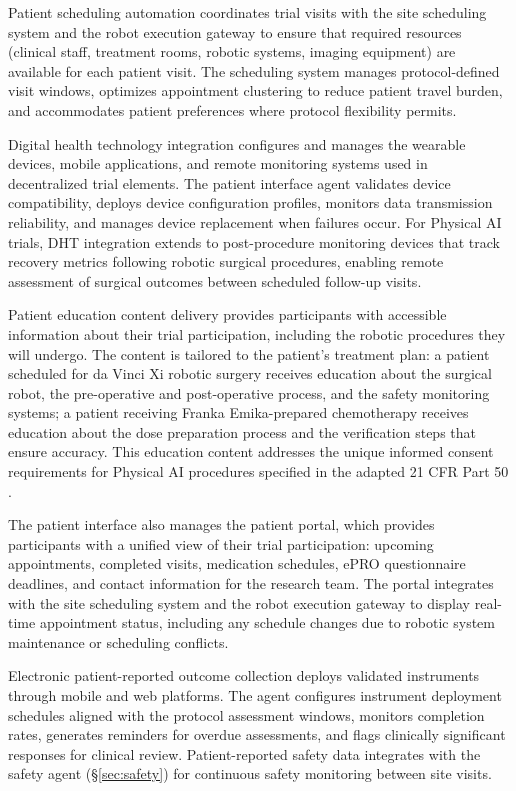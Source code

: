 Patient scheduling automation coordinates trial visits with the site scheduling system and
the robot execution gateway to ensure that required resources (clinical staff, treatment
rooms, robotic systems, imaging equipment) are available for each patient visit. The
scheduling system manages protocol-defined visit windows, optimizes appointment clustering
to reduce patient travel burden, and accommodates patient preferences where protocol
flexibility permits.

Digital health technology integration configures and manages the wearable devices, mobile
applications, and remote monitoring systems used in decentralized trial elements. The
patient interface agent validates device compatibility, deploys device configuration
profiles, monitors data transmission reliability, and manages device replacement when
failures occur. For Physical AI trials, DHT integration extends to post-procedure
monitoring devices that track recovery metrics following robotic surgical procedures,
enabling remote assessment of surgical outcomes between scheduled follow-up visits.

Patient education content delivery provides participants with accessible information
about their trial participation, including the robotic procedures they will undergo. The
content is tailored to the patient's treatment plan: a patient scheduled for da Vinci Xi
robotic surgery receives education about the surgical robot, the pre-operative and
post-operative process, and the safety monitoring systems; a patient receiving
Franka Emika-prepared chemotherapy receives education about the dose preparation process
and the verification steps that ensure accuracy. This education content addresses the
unique informed consent requirements for Physical AI procedures specified in the adapted
21 CFR Part 50 \cite{cfr50-adapt}.

The patient interface also manages the patient portal, which provides participants with
a unified view of their trial participation: upcoming appointments, completed visits,
medication schedules, ePRO questionnaire deadlines, and contact information for the
research team. The portal integrates with the site scheduling system and the robot
execution gateway to display real-time appointment status, including any schedule
changes due to robotic system maintenance or scheduling conflicts.

Electronic patient-reported outcome collection deploys validated instruments through
mobile and web platforms. The agent configures instrument deployment schedules aligned
with the protocol assessment windows, monitors completion rates, generates reminders for
overdue assessments, and flags clinically significant responses for clinical review.
Patient-reported safety data integrates with the safety agent (\S\ref{sec:safety}) for
continuous safety monitoring between site visits.
